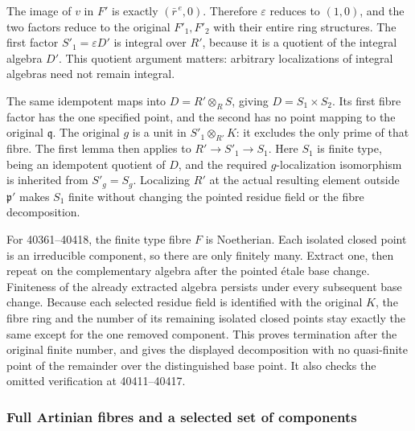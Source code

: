 The image of \(v\) in \(F'\) is exactly \((\bar r^{\,e},0)\). Therefore \(\varepsilon\) reduces to \((1,0)\), and the two factors reduce to the original \(F'_1,F'_2\) with their entire ring structures. The first factor \(S'_1=\varepsilon D'\) is integral over \(R'\), because it is a quotient of the integral algebra \(D'\). This quotient argument matters: arbitrary localizations of integral algebras need not remain integral.

The same idempotent maps into \(D=R'\otimes_R S\), giving \(D=S_1\times S_2\). Its first fibre factor has the one specified point, and the second has no point mapping to the original \(\mathfrak q\). The original \(g\) is a unit in \(S'_1\otimes_{R'}K\): it excludes the only prime of that fibre. The first lemma then applies to \(R'\to S'_1\to S_1\). Here \(S_1\) is finite type, being an idempotent quotient of \(D\), and the required \(g\)-localization isomorphism is inherited from \(S'_g=S_g\). Localizing \(R'\) at the actual resulting element outside \(\mathfrak p'\) makes \(S_1\) finite without changing the pointed residue field or the fibre decomposition.

For 40361--40418, the finite type fibre \(F\) is Noetherian. Each isolated closed point is an irreducible component, so there are only finitely many. Extract one, then repeat on the complementary algebra after the pointed étale base change. Finiteness of the already extracted algebra persists under every subsequent base change. Because each selected residue field is identified with the original \(K\), the fibre ring and the number of its remaining isolated closed points stay exactly the same except for the one removed component. This proves termination after the original finite number, and gives the displayed decomposition with no quasi-finite point of the remainder over the distinguished base point. It also checks the omitted verification at 40411--40417.

\subsubsection{Full Artinian fibres and a selected set of components}\label{full-artinian-fibres-and-a-selected-set-of-components}

